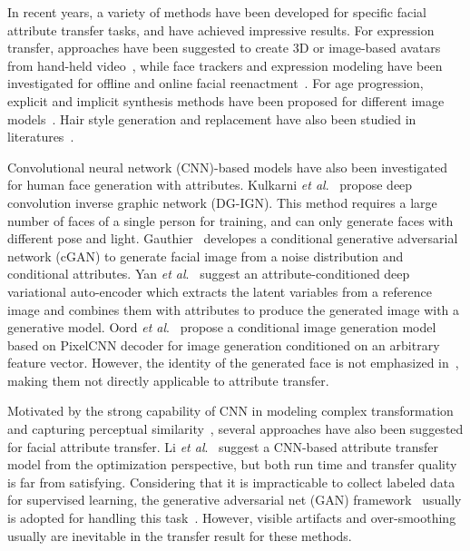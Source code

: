\documentclass[journal]{IEEEtran}
\newcommand{\etal}{\textit{et al}.}
\begin{document}
In recent years, a variety of methods have been developed for specific facial attribute transfer tasks, and have achieved impressive results. For expression transfer, approaches have been suggested to create 3D or image-based avatars from hand-held video~\cite{ichim2015avatar}, while face trackers and expression modeling have been investigated for offline and online facial reenactment~\cite{kemelmacher-shlizerman2010, thies2016face}. For age progression, explicit and implicit synthesis methods have been proposed for different image models~\cite{fu2010age, Kemelmacher-Shlizerman2014age}. Hair style generation and replacement have also been studied in literatures~\cite{hu2015hair, kemelmacher-shlizerman2016hair}.

Convolutional neural network (CNN)-based models have also been investigated for human face generation with attributes. Kulkarni \etal~\cite{kulkarni2015deep} propose deep convolution inverse graphic network (DG-IGN). This method requires a large number of faces of a single person for training, and can only generate faces with different pose and light. Gauthier~\cite{gauthier2014conditional} developes a conditional generative adversarial network (cGAN) to generate facial image from a noise distribution and conditional attributes. Yan \etal~\cite{yan2015attribute2image} suggest an attribute-conditioned deep variational auto-encoder which extracts the latent variables from a reference image and combines them with attributes to produce the generated image with a generative model. Oord \etal~\cite{Oord2016decoders} propose a conditional image generation model based on PixelCNN decoder for image generation conditioned on an arbitrary feature vector. However, the identity of the generated face is not emphasized in~\cite{gauthier2014conditional, yan2015attribute2image, Oord2016decoders}, making them not directly applicable to attribute transfer.


Motivated by the strong capability of CNN in modeling complex transformation~\cite{johnson2016perceptual} and capturing perceptual similarity~\cite{gatys2015style}, several approaches have also been suggested for facial attribute transfer.
Li \etal~\cite{li2016convolutional} suggest a CNN-based attribute transfer model from the optimization perspective, but both run time and transfer quality is far from satisfying.
Considering that it is impracticable to collect labeled data for supervised learning, the generative adversarial net (GAN) framework~\cite{goodfellow2014generative} usually is adopted for handling this task~\cite{Perarnau2016,larsen2015autoencoding,zhou2017genegan, shen2017learning}.
However, visible artifacts and over-smoothing usually are inevitable in the transfer result for these methods.
\end{document}
